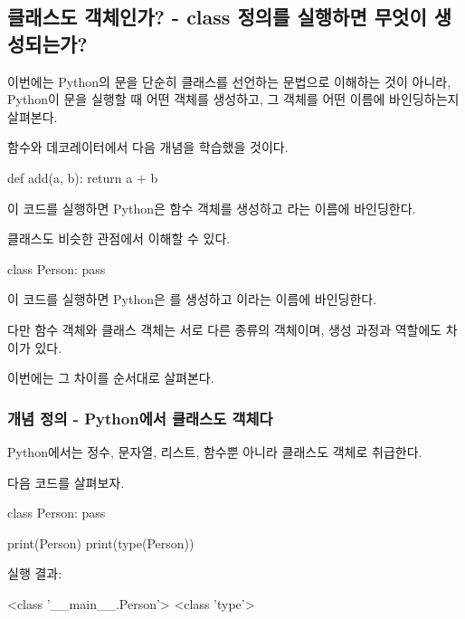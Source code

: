 

\subsection{클래스도 객체인가? - class 정의를 실행하면 무엇이 생성되는가?}

이번에는 Python의 문을 단순히 클래스를 선언하는 문법으로 이해하는 것이 아니라, Python이 문을 실행할 때 어떤 객체를 생성하고, 그 객체를 어떤 이름에 바인딩하는지 살펴본다.

함수와 데코레이터에서 다음 개념을 학습했을 것이다.

\begin{dhkcode}
def add(a, b):
    return a + b
\end{dhkcode}

이 코드를 실행하면 Python은 함수 객체를 생성하고 라는 이름에 바인딩한다.

클래스도 비슷한 관점에서 이해할 수 있다.

\begin{dhkcode}
class Person:
    pass
\end{dhkcode}

이 코드를 실행하면 Python은 를 생성하고 이라는 이름에 바인딩한다.

다만 함수 객체와 클래스 객체는 서로 다른 종류의 객체이며, 생성 과정과 역할에도 차이가 있다.

이번에는 그 차이를 순서대로 살펴본다.

\subsubsection{개념 정의 - Python에서 클래스도 객체다}

Python에서는 정수, 문자열, 리스트, 함수뿐 아니라 클래스도 객체로 취급한다.

다음 코드를 살펴보자.

\begin{dhkcode}
class Person:
    pass

print(Person)
print(type(Person))
\end{dhkcode}

실행 결과:

\begin{dhkzsh}
<class '__main__.Person'>
<class 'type'>
\end{dhkzsh}

